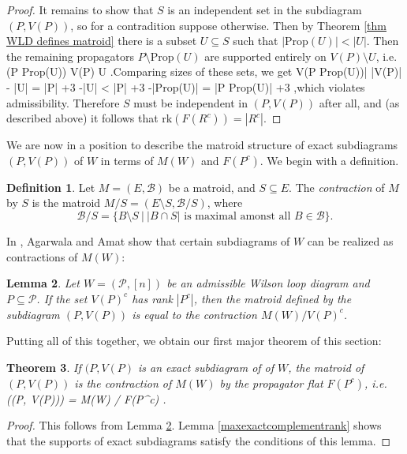 \documentclass[11pt]{article}
\newcommand{\rk}{\textrm{rk} }
\def\bas #1\eas{\begin{align*} #1 \end{align*}}
\newcommand{\cP}{\mathcal{P}}
\newcommand{\cB}{\mathcal{B}}
\newcommand{\Prop}{\textrm{Prop}}
\newtheorem{thm}{Theorem}[section]
\newtheorem{lem}[thm]{Lemma}
\theoremstyle{remark}
\theoremstyle{definition}
\newtheorem{dfn}[thm]{Definition}
\begin{document}
\begin{proof}
It remains to show that $S$ is an independent set in the subdiagram $(P, V(P))$, so for a contradition suppose otherwise. Then by Theorem \ref{thm WLD defines matroid} there is a subset $U \subseteq S$ such that $|\Prop(U)| < |U|$. Then the remaining propagators $P \setminus \Prop(U)$ are supported entirely on $V(P) \setminus U$, i.e. \bas  V(P \setminus \Prop(U)) \subseteq V(P) \setminus U\; .\eas Comparing sizes of these sets, we get \bas |V(P \setminus \Prop(U))| \leq |V(P)| - |U| = |P| +3 -|U| < |P| +3 -|\Prop(U)| = |P \setminus \Prop(U)| +3\; ,\eas which violates admissibility. Therefore $S$ must be independent in $(P, V(P))$ after all, and (as described above) it follows that $\rk(F(R^c)) = |R^c|$.

\end{proof}

We are now in a position to describe the matroid structure of exact subdiagrams $(P, V(P))$ of $W$ in terms of $M(W)$ and $F(P^c)$. We begin with a definition.

\begin{dfn}\label{matroid contraction}
Let $M = (E,\cB)$ be a matroid, and $S \subseteq E$. The {\em contraction} of $M$ by $S$ is the matroid $M/S = (E \setminus S, \cB / S)$, where
\[\cB / S = \{B \setminus S \ \big| \ |B\cap S | \text{ is maximal amonst all }B \in \cB\}.\]
\end{dfn}

In \cite{wilsonloop}, Agarwala and Amat show that certain subdiagrams of $W$ can be realized as contractions of $M(W)$:

\begin{lem} \label{contractsubdiaglem} \cite[Theorem 3.33]{wilsonloop} 
Let $W = (\cP, [n])$ be an admissible Wilson loop diagram and $P \subseteq \cP$. If the set $V(P)^c$ has rank $|P^c|$, then the matroid defined by the subdiagram $(P, V(P))$ is equal to the contraction $M(W)/V(P)^c$.
\end{lem}

Putting all of this together, we obtain our first major theorem of this section:

\begin{thm} \label{exact diagrams contractions}
If $(P, V(P)$ is an exact subdiagram of of $W$, the matroid of $(P,V(P))$ is the contraction of $M(W)$ by the propagator flat $F(P^c)$, i.e. \bas M\big((P, V(P))\big) = M(W)  / F(P^c) \;.\eas 
\end{thm}

\begin{proof}
This follows from Lemma \ref{contractsubdiaglem}. Lemma \ref{maxexactcomplementrank} shows that the supports of exact subdiagrams satisfy the conditions of this lemma.
\end{proof}
\end{document}
